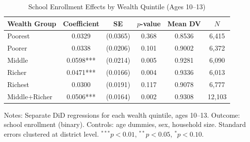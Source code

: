 \begin{table}[H]
\centering
\caption{School Enrollment Effects by Wealth Quintile (Ages 10--13)}
\label{tab:enrollment_wealth}
\begin{threeparttable}
\begin{tabular}{lccccc}
\toprule
Wealth Group & Coefficient & SE & $p$-value & Mean DV & $N$ \\
\midrule
Poorest & 0.0329 & (0.0365) & 0.368 & 0.8536 & 6,415 \\
Poorer & 0.0338 & (0.0206) & 0.101 & 0.9002 & 6,372 \\
Middle & 0.0598*** & (0.0214) & 0.005 & 0.9281 & 6,090 \\
Richer & 0.0471*** & (0.0166) & 0.004 & 0.9336 & 6,013 \\
Richest & 0.0300 & (0.0191) & 0.117 & 0.9078 & 6,777 \\
\midrule
Middle+Richer & 0.0506*** & (0.0164) & 0.002 & 0.9308 & 12,103 \\
\bottomrule
\end{tabular}
\begin{tablenotes}
\footnotesize
\item Notes: Separate DiD regressions for each wealth quintile, ages 10--13. Outcome: school enrollment (binary). Controls: age dummies, sex, household size. Standard errors clustered at district level. $^{***}p<0.01$, $^{**}p<0.05$, $^{*}p<0.10$.
\end{tablenotes}
\end{threeparttable}
\end{table}